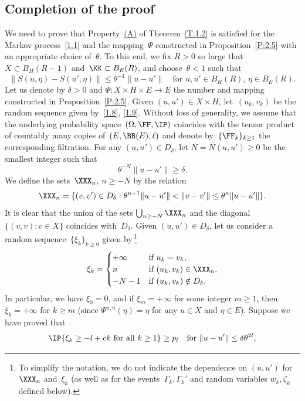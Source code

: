 \subsection{Completion of the proof}
\label{s3.4}
We need to prove that Property~\hyperlink{(A)}{(A)} of Theorem~\ref{T:1.2} is satisfied for the Markov process~\eqref{1.1} and the mapping~$\varPsi$ constructed in Proposition~\ref{P:2.5} with an appropriate choice of~$\theta$. To this end, we fix $R>0$ so large that $X\subset B_H(R-1)$ and~$\KK\subset B_E(R)$, and choose~$\theta<1$ such that
\begin{equation} \label{3.26}
\|S(u,\eta)-S(u',\eta)\|\le \theta^{-1}\|u-u'\|\quad
\text{for $u,u'\in B_H(R)$, $\eta\in B_E(R)$}.
\end{equation}
Let us denote by $\delta>0$ and $\varPsi:X\times H\times E\to E$ the number and mapping constructed in Proposition~\ref{P:2.5}. Given $(u,u')\in X\times H$, let~$(u_k,v_k)$ be the random sequence given by~\eqref{1.8}, \eqref{1.9}. Without loss of generality, we assume that the underlying probability space~$(\Omega,\FF,\IP)$ coincides with the tensor product of countably many copies of~$(E,\BB(E),\ell)$ and denote by~$\{\FF_k\}_{k\ge1}$ the corresponding filtration. For any $(u,u')\in D_\delta$, let $N=N(u,u')\ge0$ be the smallest integer such that
\[
\theta^{-N}\|u-u'\|\ge\delta.
\]
We define the sets~$\XXX_n$, $n\ge -N$ by the relation
\begin{equation} \label{3.27}
\XXX_n=\{(v,v')\in D_\delta:\theta^{n+1}\|u-u'\|<\|v-v'\|\le\theta^{n}\|u-u'\|\}.
\end{equation}
It is clear that the union of the sets $\bigcup_{n\ge -N}\XXX_n$ and the diagonal $\{(v,v):v\in X\}$ coincides with~$D_\delta$. Given $(u,u')\in D_\delta$, let us consider a random sequence~$\{\xi_k\}_{k\ge0}$ given by\,\footnote{To simplify the notation, we do not indicate the dependence on $(u,u')$ for~$\XXX_n$ and~$\xi_k$ (as well as for the events~$\Gamma_k,\Gamma_k'$ and random variables $w_k, \zeta_k$ defined below). }
\[
\xi_k=
\begin{cases}
+\infty&\text{if $u_k=v_k$},\\
n&\text{if $(u_k,v_k)\in\XXX_n$}, \\
-N-1 & \text{if $(u_k,v_k)\notin D_\delta$}.
\end{cases}
\]
In particular, we have $\xi_0=0$, and if $\xi_m=+\infty$ for some integer $m\ge1$, then $\xi_k=+\infty$ for $k\ge m$ (since $\varPsi^{u,u}(\eta)=\eta$ for any $u\in X$ and $\eta\in E$). Suppose we have proved that
\begin{equation} \label{3.28}
\IP\{\xi_k\ge -l+ck\text{ for all $k\ge1$}\}\ge p_l
\quad\text{for $\|u-u'\|\le \delta\theta^{2l}$},
\end{equation}
